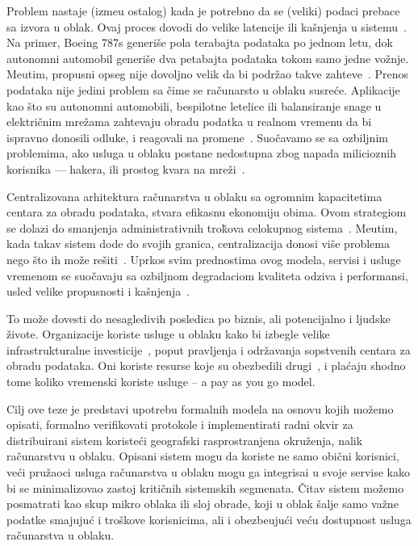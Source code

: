 Problem nastaje (izme\dj u ostalog) kada je potrebno da se (veliki) podaci prebace sa izvora u oblak. Ovaj proces dovodi do velike latencije ili ka\v snjenja u sistemu~\cite {HossainRH18}. Na primer, Boeing 787s generi\v se pola terabajta podataka po jednom letu, dok autonomni automobil generiše dva petabajta podataka tokom samo jedne vo\v znje. Me\dj utim, propusni opseg nije dovoljno velik da bi podr\v zao takve zahteve~\cite {CaoZS18}. Prenos podataka nije jedini problem sa \v cime se ra\v cunarsto u oblaku susre\'ce. Aplikacije kao \v sto su autonomni automobili, bespilotne letelice ili balansiranje snage u elektri\v cnim mre\v zama zahtevaju obradu podatka u realnom vremenu da bi ispravno donosili odluke, i reagovali na promene~\cite {CaoZS18}. Suo\v cavamo se sa ozbiljnim problemima, ako usluga u oblaku postane nedostupna zbog napada milicioznih korisnika --- hakera, ili prostog kvara na mre\v zi~\cite{GunawiHSLSAE16}.

Centralizovana arhitektura ra\v cunarstva u oblaku sa ogromnim kapacitetima centara za obradu podataka, stvara efikasnu ekonomiju obima. Ovom strategiom se dolazi do smanjenja administrativnih tro\v kova celokupnog sistema~\cite{BariBEGPRZZ13}. Me\dj utim, kada takav sistem dod\dj e do svojih granica, centralizacija donosi vi\v se problema nego \v sto ih mo\v ze re\v siti~\cite{GunawiHSLSAE16, LopezMEDHIBFR15}. Uprkos svim prednostima ovog modela, servisi i usluge vremenom se suo\v cavaju sa ozbiljnom degradaciom kvaliteta odziva i performansi, usled velike propusnosti i ka\v snjenja~\cite {KarimIWGSYO16}. 

To mo\v ze dovesti do nesagledivih posledica po biznis, ali potencijalno i ljudske živote. Organizacije koriste usluge u oblaku kako bi izbegle velike infrastrukturalne investicije~\cite {MonsalveCC18}, poput pravljenja i održavanja sopstvenih centara za obradu podataka. Oni koriste resurse koje su obezbedili drugi~\cite{Satyanarayanan17}, i pla\'caju shodno tome koliko vremenski koriste usluge -- a pay as you go model.

Cilj ove teze je predstavi upotrebu formalnih modela na osnovu kojih mo\v zemo opisati, formalno verifikovati protokole i implementirati radni okvir za distribuirani sistem koriste\'ci geografski rasprostranjena okru\v zenja, nalik ra\v cunarstvu u oblaku. Opisani sistem mogu da koriste ne samo obi\v cni korisnici, ve\'ci pru\v zaoci usluga ra\v cunarstva u oblaku mogu ga integrisai u svoje servise kako bi se minimalizovao zastoj kritičnih sistemskih segmenata. \v Citav sistem mo\v zemo posmatrati kao skup mikro oblaka ili sloj obrade, koji u oblak \v salje samo va\v zne podatke smajuju\'c i tro\v skove korisnicima, ali i obezbe\dj uju\'ci ve\'cu dostupnost usluga ra\v cunarstva u oblaku.


